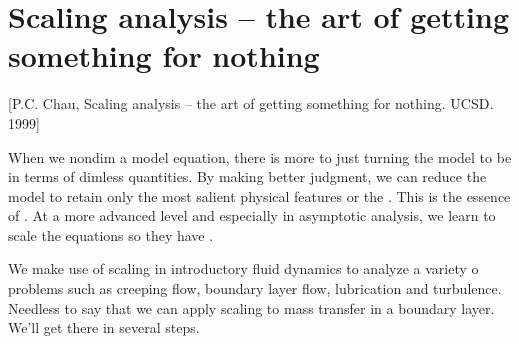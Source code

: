 \section{Scaling analysis -- the art of getting something for nothing}
%
\newcommand{\posx}{x^*} %
\newcommand{\posy}{y^*} %
\newcommand{\velx}{u^*} %
\newcommand{\vely}{v^*} %
%
\newcommand{\posz}{z^*}   %
\newcommand{\posr}{r^*}   %
\newcommand{\vela}{u^*_z} %
%
\newcommand{\refq}{_\text{ref}} %
%
\newcommand{\ndconc}{c}      %
\newcommand{\ndposx}{x}      %
\newcommand{\ndposy}{y}      %
\newcommand{\ndposz}{z}      %
\newcommand{\ndposr}{r}      %
\newcommand{\ndvelx}{u}      %
\newcommand{\ndvely}{v}      %
\newcommand{\ndtemp}{\theta} %
\newcommand{\mfpath}{\lambda}%
%
\newcommand{\fsconc}{c_{\infty}} %
\newcommand{\fsvel}{u_{\infty}}  %
\newcommand{\rradius}{\rho}      %
\newcommand{\kforcoeff}{\kappa}  %
%
\newcommand{\blthck}{\delta}          %
\newcommand{\cblthck}{\delta\txt{c}}  %
\newcommand{\tblthck}{\delta\txt{t}} %
%
\newcommand{\lilo}[1]{o\vat{#1}} %


[P.C. Chau, Scaling analysis -- the art of getting something for nothing. UCSD. 1999]

When we nondim a model equation, there is more to just turning the model to be in terms of dimless quantities. By making better judgment, we can reduce the model to retain only the most salient physical features or the . This is the essence of . At a more advanced level and especially in asymptotic analysis, we learn to scale the equations so they have .

We make use of scaling in introductory fluid dynamics to analyze a variety o problems such as creeping flow, boundary layer flow, lubrication and turbulence. Needless to say that we can apply scaling to mass transfer in a boundary layer. We'll get there in several steps.


